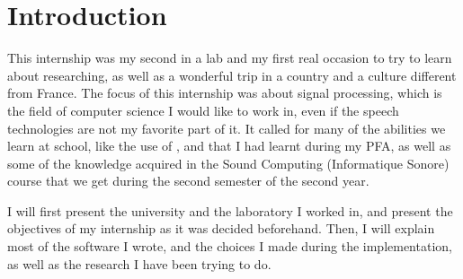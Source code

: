 \section{Introduction}
This internship was my second in a lab and my first real occasion to try to learn about researching, as well as a wonderful trip in a country and a culture different from France.
The focus of this internship was about signal processing, which is the field of computer science I would like to work in, even if the speech technologies are not my favorite part of it. It called for many of the abilities we learn at school, like the use of ,  and  that I had learnt during my \ac{PFA}, as well as some of the knowledge acquired in the Sound Computing (Informatique Sonore) course that we get during the second semester of the second year.

I will first present the university and the laboratory I worked in, and present the objectives of my internship as it was decided beforehand. Then, I will explain most of the software I wrote, and the choices I made during the implementation, as well as the research I have been trying to do.